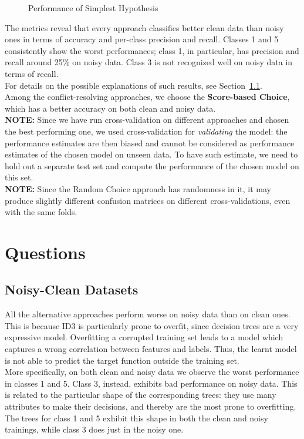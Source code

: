 \documentclass{article}
\begin{document}
\begin{figure}
{\begin{tabular}{c | c c c | c}
        \end{tabular}
    }%
    \hspace*{\fill}
    
    \caption{Performance of Simplest Hypothesis}
\end{figure}

The metrics reveal that every approach classifies better clean data than noisy ones in terms of accuracy and per-class precision and recall. Classes 1 and 5 consistently show the worst performances; class 1, in particular, has precision and recall around 25\% on noisy data. Class 3 is not recognized well on noisy data in terms of recall.\\
For details on the possible explanations of such results, see Section~\ref{sec:datasetsQuestion}.\\
Among the conflict-resolving approaches, we choose the \textbf{Score-based Choice}, which has a better accuracy on both clean and noisy data.\\
\textbf{NOTE:} Since we have run cross-validation on different approaches and chosen the best performing one, we used cross-validation for \emph{validating} the model: the performance estimates are then biased and cannot be considered as performance estimates of the chosen model on unseen data. To have such estimate, we need to hold out a separate test set and compute the performance of the chosen model on this set.\\
\textbf{NOTE:} Since the Random Choice approach has randomness in it, it may produce slightly different confusion matrices on different cross-validations, even with the same folds.

\newpage
\section{Questions}
\subsection{Noisy-Clean Datasets}
\label{sec:datasetsQuestion}
All the alternative approaches perform worse on noisy data than on clean ones. This is because ID3 is particularly prone to overfit, since decision trees are a very expressive model. Overfitting a corrupted training set leads to a model which captures a wrong correlation between features and labels. Thus, the learnt model is not able to predict the target function outside the training set.\\
More specifically, on both clean and noisy data we observe the worst performance in classes 1 and 5. Class 3, instead, exhibits bad performance on noisy data. This is related to the particular shape of the corresponding trees: they use many attributes to make their decisions, and thereby are the most prone to overfitting. The trees for class 1 and 5 exhibit this shape in both the clean and noisy trainings, while class 3 does just in the noisy one.
\end{document}
